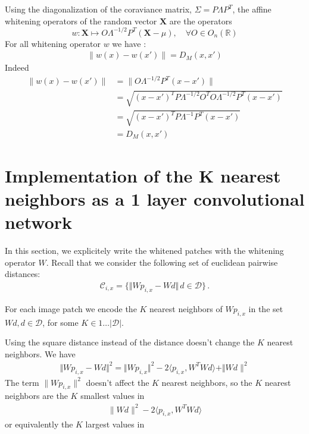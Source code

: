 \documentclass{article}
\begin{document}
{Using the diagonalization of the coraviance matrix,  $\Sigma = P\Lambda P^T$, the affine whitening operators of the random vector $\mathbf{X}$ are the operators 
\begin{equation}
\label{whitening}
     w : \mathbf{X} \mapsto O \Lambda^{-1/2} P^T (\mathbf{X} - \mu), \quad \forall O \in  O_n (\mathbb{R})
\end{equation}
For all whitening operator $w$ we have :
\begin{align*}
\|w(x) - w(x')\| = D_M(x, x')
\end{align*}
Indeed 
\begin{align*}
  \|w(x) - w(x')\|
    &= \| O \Lambda^{-1/2} P^T ( x - x') \|\\
    &= \sqrt{(x - x')^T P \Lambda^{-1/2} O^T O \Lambda^{-1/2} P^T (x - x') }\\
    &=  \sqrt{ (x - x')^T P \Lambda^{-1} P^T (x - x')} \\
    &= D_M(x, x') 
\end{align*}

\section{Implementation of the K nearest neighbors as a 1 layer convolutional network}

In this section, we explicitely write the whitened patches with the whitening operator $W$.
Recall that  we consider the following set of euclidean pairwise distances:
\begin{align*}\mathcal{C}_{i, x} =\{\Vert W p_{i, x} - W d \Vert\, d\in\mathcal{D} \}\,.\end{align*}

For each image patch we encode the $K$ nearest neighbors of $W p_{i,x}$ in the set $Wd, d \in \mathcal{D}$, for some $ K \in 1 \ldots|\mathcal{D}| $.

Using the square distance instead of the distance doesn't change the $K$ nearest neighbors.
We have 
\begin{align*} \Vert Wp_{i,x} - Wd \Vert^2 = \Vert Wp_{i,x} \Vert^2 - 2 \langle p_{i,x}, W^T W d \rangle + \Vert Wd\|^2 \end{align*}
The term $\|Wp_{i,x}\|^2$ doesn't affect the $K$ nearest neighbors, so the $K$ nearest neighbors are the $K$ smallest values in
\begin{align*}
        \|Wd \|^2 - 2\langle p_{i,x}, W^T W d \rangle
\end{align*}
or equivalently the  $K$ largest values in

}
\end{document}
